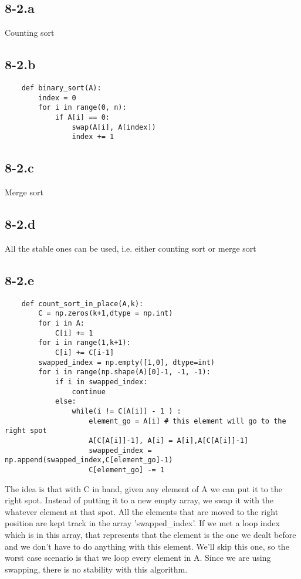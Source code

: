\documentclass{article}
\begin{document}
	\subsection*{8-2.a}
	Counting sort
	\subsection*{8-2.b}
	\begin{verbatim}
	def binary_sort(A):
		index = 0
		for i in range(0, n):
			if A[i] == 0:
				swap(A[i], A[index])
				index += 1
	\end{verbatim}
	\subsection*{8-2.c}
	Merge sort
	\subsection*{8-2.d}
	All the stable ones can be used, i.e. either counting sort or merge sort
	\subsection*{8-2.e}
	\begin{verbatim}
	def count_sort_in_place(A,k):
		C = np.zeros(k+1,dtype = np.int)
		for i in A:
			C[i] += 1
		for i in range(1,k+1):
			C[i] += C[i-1]
		swapped_index = np.empty([1,0], dtype=int)
		for i in range(np.shape(A)[0]-1, -1, -1):
			if i in swapped_index:
				continue
			else:
				while(i != C[A[i]] - 1 ) :
					element_go = A[i] # this element will go to the right spot
					A[C[A[i]]-1], A[i] = A[i],A[C[A[i]]-1]
					swapped_index = np.append(swapped_index,C[element_go]-1)
					C[element_go] -= 1		
	\end{verbatim}
	The idea is that with C in hand, given any element of A we can put it to the right spot. Instead of putting it to a new empty array, we swap it with the whatever element at that spot. All the elements that are moved to the right position are kept track in the array 'swapped\_index'. If we met a loop index which is in this array, that represents that the element is the one we dealt before and we don't have to do anything with this element. We'll skip this one, so the worst case scenario is that we loop every element in A. Since we are using swapping, there is no stability with this algorithm.
\end{document}
